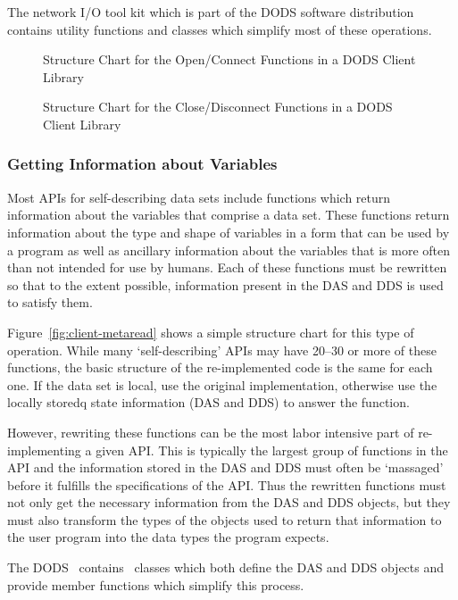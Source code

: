 The network I/O tool kit which is part of the DODS software distribution
contains utility functions and classes which simplify most of these
operations. 

\begin{figure}
\centerline{}
\caption{Structure Chart for the Open/Connect Functions in a DODS Client
  Library}
\label{fig:client-open}
\end{figure}

\begin{figure}
\centerline{}
\caption{Structure Chart for the Close/Disconnect Functions in a DODS Client
  Library}
\label{fig:client-close}
\end{figure}
 
\subsubsection{Getting Information about Variables}

Most APIs for self-describing data sets include functions which return
information about the variables that comprise a data set. These functions
return information about the type and shape of variables in a form that can
be used by a program as well as ancillary information about the variables
that is more often than not intended for use by humans. Each of these
functions must be rewritten so that to the extent possible, information
present in the DAS and DDS is used to satisfy them.

Figure~\ref{fig:client-metaread} shows a simple structure chart for this type
of operation. While many `self-describing' APIs may have 20--30 or more of
these functions, the basic structure of the re-implemented code is the same
for each one. If the data set is local, use the original implementation,
otherwise use the locally storedq state information (DAS and DDS) to answer
the function.

However, rewriting these functions can be the most labor intensive part of
re-implementing a given API\@. This is typically the largest group of functions
in the API and the information stored in the DAS and DDS must often
be `massaged' before it fulfills the specifications of the API\@. Thus the
rewritten functions must not only get the necessary information from the DAS
and DDS objects, but they must also transform the types of the objects used
to return that information to the user program into the data types the
program expects.

The DODS \Toolkit\ contains \Cpp\ classes which both define the DAS and DDS
objects and provide member functions which simplify this process.

